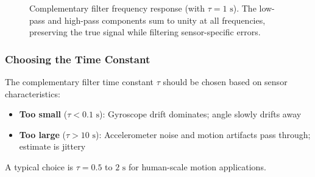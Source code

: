 \begin{figure}[htbp]
    \centering
    \caption{Complementary filter frequency response (with $\tau = 1\text{ s}$). The low-pass and high-pass components sum to unity at all frequencies, preserving the true signal while filtering sensor-specific errors.}
    \label{fig:complementary_filter}
\end{figure}

\subsubsection{Choosing the Time Constant}

The complementary filter time constant $\tau$ should be chosen based on sensor characteristics:
\begin{itemize}
    \item \textbf{Too small} ($\tau < 0.1\text{ s}$): Gyroscope drift dominates; angle slowly drifts away
    \item \textbf{Too large} ($\tau > 10\text{ s}$): Accelerometer noise and motion artifacts pass through; estimate is jittery
\end{itemize}

A typical choice is $\tau = 0.5$ to $2\text{ s}$ for human-scale motion applications.

